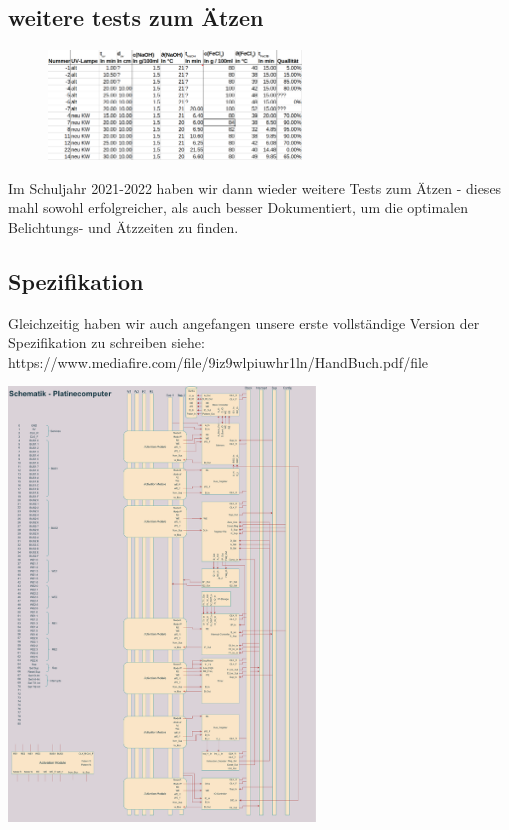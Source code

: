 \documentclass{scrartcl}
\begin{document}
    \subsection{weitere tests zum Ätzen}
        \begin{figure}
        \vspace{-40pt}
        \begin{center}
        \includegraphics[width=0.6\textwidth]{aetzen_tabelle}
        \end{center}
        \vspace{-20pt}
        \end{figure}
    Im Schuljahr 2021-2022 haben wir dann wieder weitere Tests zum Ätzen - dieses mahl sowohl erfolgreicher, als auch besser Dokumentiert, um die optimalen Belichtungs- und Ätzzeiten zu finden.

    \subsection{Spezifikation}
    Gleichzeitig haben wir auch angefangen unsere erste vollständige Version der Spezifikation zu schreiben siehe: https://www.mediafire.com/file/9iz9wlpiuwhr1ln/HandBuch.pdf/file

    \includegraphics[width=0.612\textwidth]{arch.drawio}
    
\end{document}
